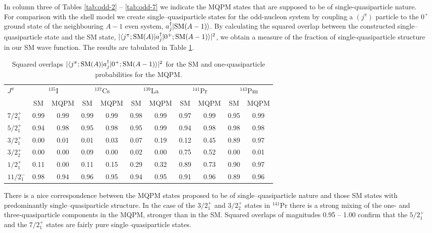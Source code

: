 In column three of Tables \ref{tab:odd-2} -- \ref{tab:odd-7} we indicate
the MQPM states that are supposed to be of single-quasiparticle nature.
For comparison with the shell model we create single--quasiparticle states
for the odd-nucleon system by coupling a $(j^{\pi})$ particle to the 
$0^{+}$ ground state of the neighbouring $A-1$ even system, 
$a^{\dagger}_{j}|{\rm SM}(A-1)\rangle $. 
By calculating the squared overlap between
the constructed single--quasiparticle state and the SM state,
$\vert\langle j^{\pi};{\rm SM}(A)|a^{\dagger}_{j}|0^{+};{\rm SM}(A-1) 
\rangle \vert^{2}$, we obtain
a measure of the fraction of single-quasiparticle structure in our SM
wave function. The results are tabulated in Table \ref{tab:quasi-particle}.
\begin{table}[htbp]
\begin{center}
\caption{Squared overlaps 
$\vert\langle j^{\pi};{\rm SM}(A)|a^{\dagger}_{j}|0^{+};{\rm SM}(A-1) 
\rangle \vert^{2}$ for the SM and one-quasiparticle probabilities for the
MQPM.}
\begin{tabular}{lcccccccccc}
\hline
$J^{\pi}$ & \multicolumn{2}{c}{$^{135}$I} & \multicolumn{2}{c}{$^{137}$Cs}
& \multicolumn{2}{c}{$^{139}$La} & \multicolumn{2}{c}{$^{141}$Pr} 
& \multicolumn{2}{c}{$^{143}$Pm} \\
& SM & MQPM & SM & MQPM & SM & MQPM & SM & MQPM & SM & MQPM \\
\hline
$7/2^{+}_{1}$  & 0.99 & 0.99 & 0.99 & 0.99 & 0.98 & 0.99 & 0.97 & 0.99
& 0.95 & 0.99 \\
$5/2^{+}_{1}$  & 0.94 & 0.98 & 0.95 & 0.98 & 0.95 & 0.99 & 0.94 & 0.98
& 0.98 & 0.98 \\
$3/2^{+}_{1}$  & 0.00 & 0.01 & 0.01 & 0.03 & 0.07 & 0.19 & 0.12 & 0.45
& 0.89 & 0.97 \\
$3/2^{+}_{2}$  & 0.00 & 0.00 & 0.09 & 0.00 & 0.02 & 0.00 & 0.75 & 0.52
& 0.00 & 0.01 \\
$1/2^{+}_{1}$  & 0.11 & 0.00 & 0.11 & 0.15 & 0.29 & 0.32 & 0.89 & 0.73
& 0.90 & 0.97 \\
$11/2^{-}_{1}$ & 0.98 & 0.94 & 0.96 & 0.95 & 0.94 & 0.95 & 0.91 & 0.96
& 0.89 & 0.96 \\
\hline
\end{tabular}
\label{tab:quasi-particle}
\end{center}
\end{table}
There is a nice correspondence
between the MQPM states proposed to be of single--quasiparticle nature and 
those SM states with predominantly single--quasiparticle structure.
In the case of the $3/2^+_1$ and $3/2^+_2$ states in $^{141}$Pr there
is a strong mixing of the one- and three-quasiparticle components in
the MQPM, stronger than in the SM.
Squared overlaps of magnitudes 0.95 -- 1.00 confirm that the $5/2^{+}_{1}$
and the $7/2^{+}_{1}$ states are fairly pure single--quasiparticle states.



